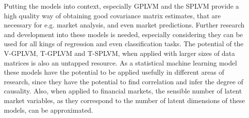 Putting the models into context, especially GPLVM and the SPLVM provide a high quality way of obtaining good covariance matrix estimates, that are necessary for e.g. market analysis, and even market predictions. \newline \newline
Further research and development into these models is needed, especially considering they can be used for all kings of regression and even classification tasks. The potential of the V-GPLVM, T-GPLVM and T-SPLVM, when applied with larger sizes of data matrices is also an untapped resource. As a statistical machine learning model these models have the potential to be applied usefully in different areas of research, since they have the potential to find correlation and infer the degree of causality. Also, when applied to financial markets, the sensible number of latent market variables, as they correspond to the number of latent dimensions of these models, can be approximated.